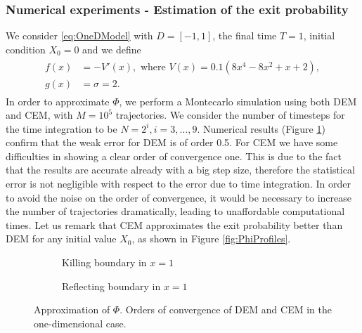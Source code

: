 \subsubsection{Numerical experiments - Estimation of the exit probability}

We consider \eqref{eq:OneDModel} with $D = \left[ -1, 1 \right]$, the final time $T = 1$, initial condition $X_0 = 0$ and we define
\begin{align}\label{eq:FunctionsOneDSmoothPhi}
\begin{split}
	f(x) &= -V'(x), \text{ where } V(x) = 0.1(8x^4 - 8x^2 + x + 2), \\
	g(x) &= \sigma = 2.
\end{split}
\end{align}
In order to approximate $\Phi$, we perform a Montecarlo simulation using both DEM and CEM, with $M = 10^5$ trajectories. We consider the number of timesteps for the time integration to be $N = 2^i, i = 3, \dots, 9$. Numerical results (Figure \ref{fig:KillOneDPhi}) confirm that the weak error for DEM is of order 0.5. For CEM we have some difficulties in showing a clear order of convergence one. This is due to the fact that the results are accurate already with a big step size, therefore the statistical error is not negligible with respect to the error due to time integration. In order to avoid the noise on the order of convergence, it would be necessary to increase the number of trajectories dramatically, leading to unaffordable computational times. Let us remark that CEM approximates the exit probability better than DEM for any initial value $X_0$, as shown in Figure \ref{fig:PhiProfiles}.

\begin{figure}[t]
    \centering
    \begin{subfigure}{0.49\linewidth}
        \centering
        \resizebox{1\linewidth}{!}{ }  
        \caption{Killing boundary in $x = 1$}
        \label{fig:KillOneDPhi}
    \end{subfigure}
    \begin{subfigure}{0.49\linewidth}
        \centering
        \resizebox{1\linewidth}{!}{ }  
        \caption{Reflecting boundary in $x = 1$}
        \label{fig:ReflectOneDPhi}
    \end{subfigure}    
    \caption{Approximation of $\Phi$. Orders of convergence of DEM and CEM in the one-dimensional case.}
    \label{fig:OrdersOneDPhi}
\end{figure}

